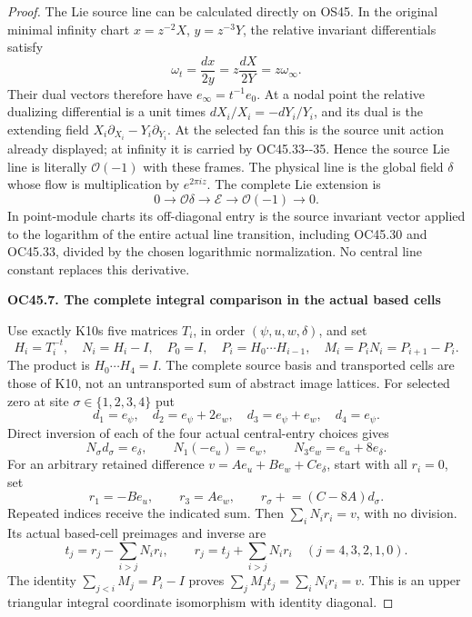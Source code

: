 \begin{proof}
The Lie source line can be calculated directly on OS45. In the
original minimal infinity chart \(x=z^{-2}X\), \(y=z^{-3}Y\),
the relative invariant differentials satisfy
\[
 \omega_t=\frac{dx}{2y}
           =z\frac{dX}{2Y}=z\omega_\infty .
 \tag{OC45.37}
\]
Their dual vectors therefore have
\(e_\infty=t^{-1}e_0\). At a nodal point the relative dualizing
differential is a unit times \(dX_i/X_i=-dY_i/Y_i\), and its
dual is the extending field \(X_i\partial_{X_i}-Y_i\partial_{Y_i}\).
At the selected fan this is the source unit action already
displayed; at infinity it is carried by OC45.33-\/-35. Hence the
source Lie line is literally \(\mathcal O(-1)\) with these frames.
The physical line is the global field \(\delta\) whose flow is
multiplication by \(e^{2\pi iz}\). The complete Lie extension is
\[
 0\longrightarrow\mathcal O\delta\longrightarrow\mathscr E
       \longrightarrow\mathcal O(-1)\longrightarrow0.
 \tag{OC45.38}
\]
In point-module charts its off-diagonal entry is the source
invariant vector applied to the logarithm of the entire actual
line transition, including OC45.30 and OC45.33, divided by the
chosen logarithmic normalization. No central line constant
replaces this derivative.

\par

\medskip\noindent\textbf{OC45.7. The complete integral comparison in the actual based cells}

\par\nobreak

Use exactly K10\textquotesingle s five matrices \(T_i\), in order
\((\psi,u,w,\delta)\), and set
\[
 H_i=T_i^{-t},\quad N_i=H_i-I,\quad
 P_0=I,\quad P_i=H_0\cdots H_{i-1},\quad
 M_i=P_iN_i=P_{i+1}-P_i.
 \tag{OC45.39}
\]
The product is \(H_0\cdots H_4=I\). The complete source basis
and transported cells are those of K10, not an untransported
sum of abstract image lattices. For selected zero at site
\(\sigma\in\{1,2,3,4\}\) put
\[
 d_1=e_\psi,\quad d_2=e_\psi+2e_w,\quad
 d_3=e_\psi+e_w,\quad d_4=e_\psi .
 \tag{OC45.40}
\]
Direct inversion of each of the four actual central-entry choices
gives
\[
 N_\sigma d_\sigma=e_\delta,\qquad
 N_1(-e_u)=e_w,\qquad N_3e_w=e_u+8e_\delta.
 \tag{OC45.41}
\]
For an arbitrary retained difference
\(v=Ae_u+Be_w+Ce_\delta\), start with all \(r_i=0\), set
\[
 r_1=-Be_u,\qquad r_3=Ae_w,\qquad
 r_\sigma\mathrel{+}=(C-8A)d_\sigma .
 \tag{OC45.42}
\]
Repeated indices receive the indicated sum. Then
\(\sum_iN_ir_i=v\), with no division. Its actual based-cell
preimages and inverse are
\[
 t_j=r_j-\sum_{i>j}N_i r_i,\qquad
 r_j=t_j+\sum_{i>j}N_i r_i\quad(j=4,3,2,1,0).
 \tag{OC45.43}
\]
The identity \(\sum_{j<i}M_j=P_i-I\) proves
\(\sum_jM_jt_j=\sum_iN_ir_i=v\).
This is an upper triangular integral coordinate isomorphism
with identity diagonal.


\end{proof}
